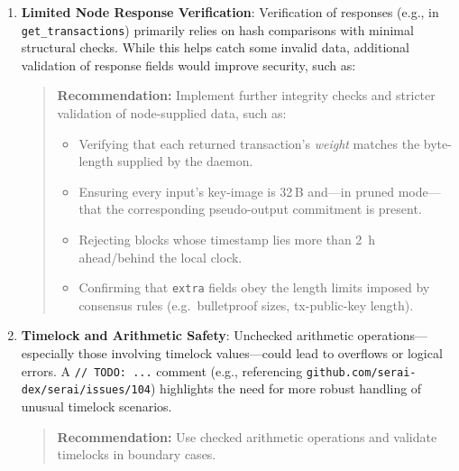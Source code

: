 \documentclass[12pt,a4paper]{article}
\begin{document}
\begin{enumerate}
    \item \textbf{Limited Node Response Verification}:
    Verification of responses (e.g., in \\\texttt{get\_transactions}) primarily relies on hash
    comparisons with minimal structural checks. While this helps catch some invalid data, additional
    validation of response fields would improve security, such as:
    \begin{quote}
         \textbf{Recommendation:} Implement further integrity checks and stricter validation of node-supplied data, such as:
          \begin{itemize}
            \item Verifying that each returned transaction’s \emph{weight} matches the
                  byte-length supplied by the daemon.
            \item Ensuring every input’s key-image is 32\,B and—in pruned mode—that the
                  corresponding pseudo-output commitment is present.
            \item Rejecting blocks whose timestamp lies more than
                  \SI{2}{\hour} ahead/behind the local clock.
            \item Confirming that \texttt{extra} fields obey the length limits imposed
                  by consensus rules (e.g.\ bulletproof sizes, tx-public-key length).
          \end{itemize}
    \end{quote}

    \item \textbf{Timelock and Arithmetic Safety}:
    Unchecked arithmetic operations—especially those involving timelock values—could lead to
    overflows or logical errors. A \texttt{// TODO: ...} comment (e.g., referencing
    \texttt{github.com/serai-dex/serai/issues/104}) highlights the need for more robust handling of
    unusual timelock scenarios.
    \begin{quote}
         \textbf{Recommendation:} Use checked arithmetic operations and validate timelocks in boundary cases.
    \end{quote}



\end{enumerate}
\end{document}
